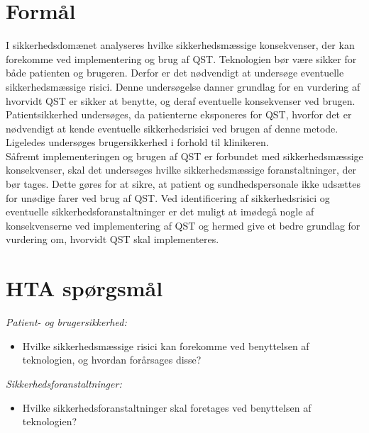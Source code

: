 \section{Formål}
I sikkerhedsdomænet analyseres hvilke sikkerhedsmæssige konsekvenser, der kan forekomme ved implementering og brug af QST. Teknologien bør være sikker for både patienten og brugeren. Derfor er det nødvendigt at undersøge eventuelle sikkerhedsmæssige risici. Denne undersøgelse danner grundlag for en vurdering af hvorvidt QST er sikker at benytte, og deraf eventuelle konsekvenser ved brugen. \\
Patientsikkerhed undersøges, da patienterne eksponeres for QST, hvorfor det er nødvendigt at kende eventuelle sikkerhedsrisici ved brugen af denne metode. Ligeledes undersøges brugersikkerhed i forhold til klinikeren. \\
Såfremt implementeringen og brugen af QST er forbundet med sikkerhedsmæssige konsekvenser, skal det undersøges hvilke sikkerhedsmæssige foranstaltninger, der bør tages. Dette gøres for at sikre, at patient og sundhedspersonale ikke udsættes for unødige farer ved brug af QST. Ved identificering af sikkerhedsrisici og eventuelle sikkerhedsforanstaltninger er det muligt at imødegå nogle af konsekvenserne ved implementering af QST og hermed give et bedre grundlag for vurdering om, hvorvidt QST skal implementeres.
\section{HTA spørgsmål}
\textit{Patient- og brugersikkerhed:}
\begin{itemize}
\item Hvilke sikkerhedsmæssige risici kan forekomme ved benyttelsen af teknologien, og hvordan forårsages disse? %
\end{itemize}
\textit{Sikkerhedsforanstaltninger:}
\begin{itemize}
\item Hvilke sikkerhedsforanstaltninger skal foretages ved benyttelsen af teknologien?  %
\end{itemize}

